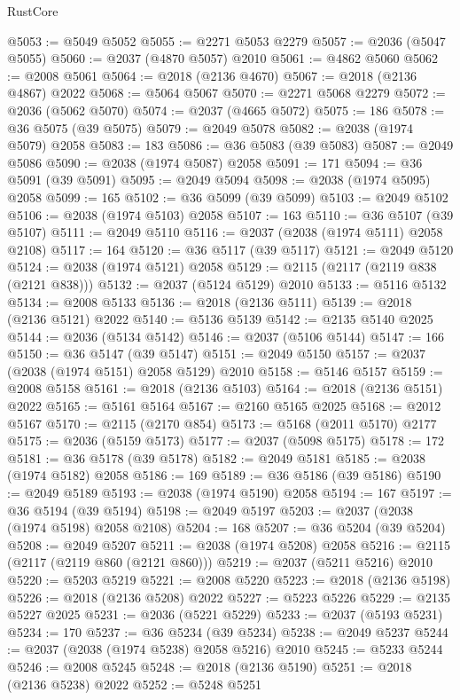 \begin{lexlean}{RustCore}
\begin{coremodule}
@5053 := @5049 @5052
@5055 := @2271 @5053 @2279
@5057 := @2036 (@5047 @5055)
@5060 := @2037 (@4870 @5057) @2010
@5061 := @4862 @5060
@5062 := @2008 @5061
@5064 := @2018 (@2136 @4670)
@5067 := @2018 (@2136 @4867) @2022
@5068 := @5064 @5067
@5070 := @2271 @5068 @2279
@5072 := @2036 (@5062 @5070)
@5074 := @2037 (@4665 @5072)
@5075 := 186
@5078 := @36 @5075 (@39 @5075)
@5079 := @2049 @5078
@5082 := @2038 (@1974 @5079) @2058
@5083 := 183
@5086 := @36 @5083 (@39 @5083)
@5087 := @2049 @5086
@5090 := @2038 (@1974 @5087) @2058
@5091 := 171
@5094 := @36 @5091 (@39 @5091)
@5095 := @2049 @5094
@5098 := @2038 (@1974 @5095) @2058
@5099 := 165
@5102 := @36 @5099 (@39 @5099)
@5103 := @2049 @5102
@5106 := @2038 (@1974 @5103) @2058
@5107 := 163
@5110 := @36 @5107 (@39 @5107)
@5111 := @2049 @5110
@5116 := @2037 (@2038 (@1974 @5111) @2058 @2108)
@5117 := 164
@5120 := @36 @5117 (@39 @5117)
@5121 := @2049 @5120
@5124 := @2038 (@1974 @5121) @2058
@5129 := @2115 (@2117 (@2119 @838 (@2121 @838)))
@5132 := @2037 (@5124 @5129) @2010
@5133 := @5116 @5132
@5134 := @2008 @5133
@5136 := @2018 (@2136 @5111)
@5139 := @2018 (@2136 @5121) @2022
@5140 := @5136 @5139
@5142 := @2135 @5140 @2025
@5144 := @2036 (@5134 @5142)
@5146 := @2037 (@5106 @5144)
@5147 := 166
@5150 := @36 @5147 (@39 @5147)
@5151 := @2049 @5150
@5157 := @2037 (@2038 (@1974 @5151) @2058 @5129) @2010
@5158 := @5146 @5157
@5159 := @2008 @5158
@5161 := @2018 (@2136 @5103)
@5164 := @2018 (@2136 @5151) @2022
@5165 := @5161 @5164
@5167 := @2160 @5165 @2025
@5168 := @2012 @5167
@5170 := @2115 (@2170 @854)
@5173 := @5168 (@2011 @5170) @2177
@5175 := @2036 (@5159 @5173)
@5177 := @2037 (@5098 @5175)
@5178 := 172
@5181 := @36 @5178 (@39 @5178)
@5182 := @2049 @5181
@5185 := @2038 (@1974 @5182) @2058
@5186 := 169
@5189 := @36 @5186 (@39 @5186)
@5190 := @2049 @5189
@5193 := @2038 (@1974 @5190) @2058
@5194 := 167
@5197 := @36 @5194 (@39 @5194)
@5198 := @2049 @5197
@5203 := @2037 (@2038 (@1974 @5198) @2058 @2108)
@5204 := 168
@5207 := @36 @5204 (@39 @5204)
@5208 := @2049 @5207
@5211 := @2038 (@1974 @5208) @2058
@5216 := @2115 (@2117 (@2119 @860 (@2121 @860)))
@5219 := @2037 (@5211 @5216) @2010
@5220 := @5203 @5219
@5221 := @2008 @5220
@5223 := @2018 (@2136 @5198)
@5226 := @2018 (@2136 @5208) @2022
@5227 := @5223 @5226
@5229 := @2135 @5227 @2025
@5231 := @2036 (@5221 @5229)
@5233 := @2037 (@5193 @5231)
@5234 := 170
@5237 := @36 @5234 (@39 @5234)
@5238 := @2049 @5237
@5244 := @2037 (@2038 (@1974 @5238) @2058 @5216) @2010
@5245 := @5233 @5244
@5246 := @2008 @5245
@5248 := @2018 (@2136 @5190)
@5251 := @2018 (@2136 @5238) @2022
@5252 := @5248 @5251

\end{coremodule}
\end{lexlean}
